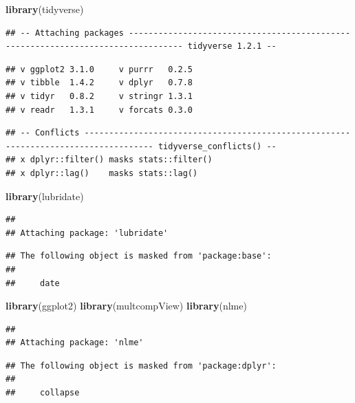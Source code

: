 \documentclass[12pt,]{article}
\newenvironment{Shaded}{\begin{snugshade}}{\end{snugshade}}
\newcommand{\KeywordTok}[1]{\textcolor[rgb]{0.13,0.29,0.53}{\textbf{#1}}}
\newcommand{\NormalTok}[1]{#1}
\begin{document}
\begin{Shaded}
\begin{Highlighting}[]
\KeywordTok{library}\NormalTok{(tidyverse)}
\end{Highlighting}
\end{Shaded}

\begin{verbatim}
## -- Attaching packages --------------------------------------------------------------------------------- tidyverse 1.2.1 --
\end{verbatim}

\begin{verbatim}
## v ggplot2 3.1.0     v purrr   0.2.5
## v tibble  1.4.2     v dplyr   0.7.8
## v tidyr   0.8.2     v stringr 1.3.1
## v readr   1.3.1     v forcats 0.3.0
\end{verbatim}

\begin{verbatim}
## -- Conflicts ------------------------------------------------------------------------------------ tidyverse_conflicts() --
## x dplyr::filter() masks stats::filter()
## x dplyr::lag()    masks stats::lag()
\end{verbatim}

\begin{Shaded}
\begin{Highlighting}[]
\KeywordTok{library}\NormalTok{(lubridate)}
\end{Highlighting}
\end{Shaded}

\begin{verbatim}
## 
## Attaching package: 'lubridate'
\end{verbatim}

\begin{verbatim}
## The following object is masked from 'package:base':
## 
##     date
\end{verbatim}

\begin{Shaded}
\begin{Highlighting}[]
\KeywordTok{library}\NormalTok{(ggplot2)}
\KeywordTok{library}\NormalTok{(multcompView)}
\KeywordTok{library}\NormalTok{(nlme)}
\end{Highlighting}
\end{Shaded}

\begin{verbatim}
## 
## Attaching package: 'nlme'
\end{verbatim}

\begin{verbatim}
## The following object is masked from 'package:dplyr':
## 
##     collapse
\end{verbatim}
\end{document}
